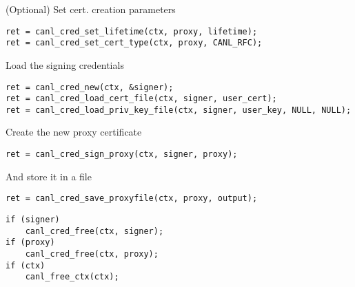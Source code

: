 (Optional) Set cert. creation parameters
\begin{lstlisting}
ret = canl_cred_set_lifetime(ctx, proxy, lifetime);
ret = canl_cred_set_cert_type(ctx, proxy, CANL_RFC);
\end{lstlisting}

Load the signing credentials
\begin{lstlisting}
ret = canl_cred_new(ctx, &signer);
ret = canl_cred_load_cert_file(ctx, signer, user_cert);
ret = canl_cred_load_priv_key_file(ctx, signer, user_key, NULL, NULL);
\end{lstlisting}

Create the new proxy certificate
\begin{lstlisting}
ret = canl_cred_sign_proxy(ctx, signer, proxy);
\end{lstlisting}

And store it in a file
\begin{lstlisting}
ret = canl_cred_save_proxyfile(ctx, proxy, output);
\end{lstlisting}


\begin{lstlisting}
if (signer)
    canl_cred_free(ctx, signer);
if (proxy)
    canl_cred_free(ctx, proxy);
if (ctx)
    canl_free_ctx(ctx);
\end{lstlisting}
